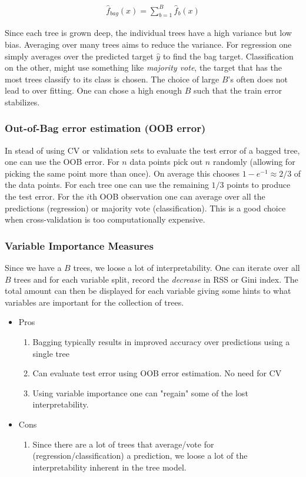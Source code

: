 \documentclass{article}
\begin{document}
\begin{align*}
    \hat{f}_{bag} (x)= \sum_{b=1}^{B} \hat{f}_b (x)
\end{align*}

Since each tree is grown deep, the individual trees have a high variance but low bias. Averaging over many trees aims to reduce the variance. For regression one simply averages over the predicted target $\hat{y}$ to find the bag target. Classification on the other, might use something like \textit{majority vote}, the target that has the most trees classify to its class is chosen. The choice of large $B$'s often does not lead to over fitting. One can chose a high enough $B$ such that the train error stabilizes.  

\subsubsection{Out-of-Bag error estimation (OOB error)}
In stead of using CV or validation sets to evaluate the test error of a bagged tree, one can use the OOB error. For $n$ data points pick out $n$ randomly (allowing for picking the same point more than once). On average this chooses $1-e^{-1} \approx 2/3$ of the data points. For each tree one can use the remaining $1/3$ points to produce the test error. For the $i$th OOB observation one can average over all the predictions (regression) or majority vote (classification). This is a good choice when cross-validation is too computationally expensive.

\subsubsection{Variable Importance Measures}
Since we have a $B$ trees, we loose a lot of interpretability. One can iterate over all $B$ trees and for each variable split, record the \textit{decrease} in RSS or Gini index. The total amount can then be displayed for each variable giving some hints to what variables are important for the collection of trees.

\begin{itemize}
    \item Pros
    \begin{enumerate}
        \item Bagging typically results in improved accuracy over predictions using a single tree \item Can evaluate test error using OOB error estimation. No need for CV  
        \item Using variable importance one can "regain" some of the lost interpretability. 
    \end{enumerate}
    \item Cons
    \begin{enumerate}
        \item Since there are a lot of trees that average/vote for (regression/classification) a prediction, we loose a lot of the interpretability inherent in the tree model.  
    \end{enumerate}
\end{itemize}
\end{document}
